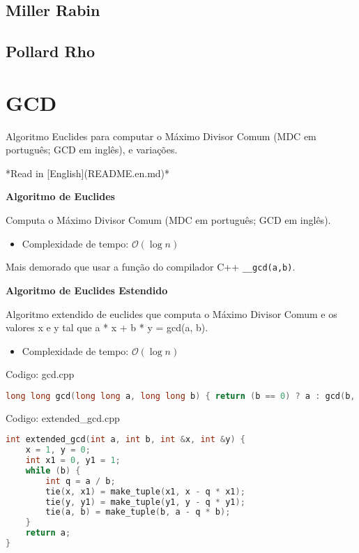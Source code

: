 \documentclass[10pt, a4paper, oneside]{book}
\begin{document}
\subsection{Miller Rabin}
\subsection{Pollard Rho}
\section{GCD}


Algoritmo Euclides para computar o Máximo Divisor Comum (MDC em português; GCD em inglês), e variações.



*Read in [English](README.en.md)*



\textbf{Algoritmo de Euclides} 



Computa o Máximo Divisor Comum (MDC em português; GCD em inglês).



\begin{itemize}
\item Complexidade de tempo: $\mathcal{O}(\log n)$
\end{itemize}



Mais demorado que usar a função do compilador C++ \texttt{\_\_gcd(a,b)}.



\textbf{Algoritmo de Euclides Estendido} 



Algoritmo extendido de euclides que computa o Máximo Divisor Comum e os valores x e y tal que a * x + b * y = gcd(a, b).



\begin{itemize}
\item Complexidade de tempo: $\mathcal{O}(\log n)$
\end{itemize}

\hfill

Codigo: gcd.cpp

\begin{lstlisting}[language=C++]
long long gcd(long long a, long long b) { return (b == 0) ? a : gcd(b, a % b); }
\end{lstlisting}
\hfill

Codigo: extended\_gcd.cpp

\begin{lstlisting}[language=C++]
int extended_gcd(int a, int b, int &x, int &y) {
    x = 1, y = 0;
    int x1 = 0, y1 = 1;
    while (b) {
        int q = a / b;
        tie(x, x1) = make_tuple(x1, x - q * x1);
        tie(y, y1) = make_tuple(y1, y - q * y1);
        tie(a, b) = make_tuple(b, a - q * b);
    }
    return a;
}
\end{lstlisting}
\hfill
\end{document}
